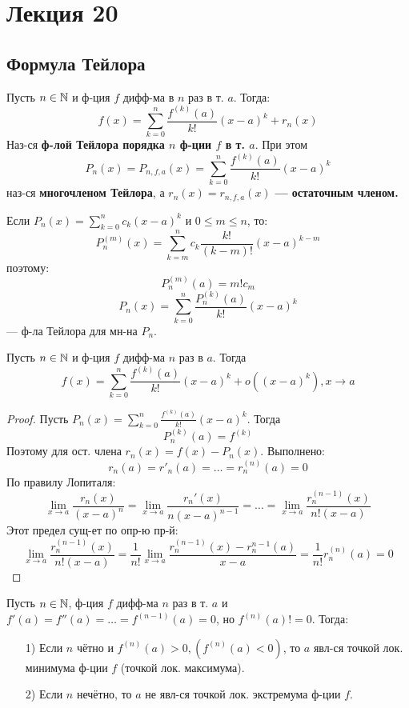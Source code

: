 \section{Лекция 20}
\subsection{Формула Тейлора}
\begin{definition}
Пусть $n \in \mathbb{N}$ и ф-ция $f$ дифф-ма в $n$ раз в т. $a$. Тогда:
\[
f(x) = \sum_{k = 0}^{n} \frac{f^{(k)}(a)}{k!}(x - a)^{k} + r_n(x)
\]
Наз-ся \textbf{ф-лой Тейлора порядка $n$ ф-ции $f$ в т. $a$}. При этом
\[
  P_n(x) = P_{n, f, a}(x) = \sum_{k = 0}^{n} \frac{f^{(k)}(a)}{k!}(x - a)^{k}
\]
наз-ся \textbf{многочленом Тейлора}, а $r_n(x) = r_{n, f, a}(x)$ \textbf{--- остаточным членом.}
\end{definition}
\begin{example}
Если $P_n(x) = \sum_{k = 0}^{n} c_k (x - a)^{k}$ и $0 \leq m \leq n$, то:
\[
P_n^{(m)}(x) = \sum_{k = m}^{n} c_k\frac{k!}{(k - m)!} (x - a)^{k - m}
\]
поэтому:
\[
P_n^{(m)}(a) = m! c_m
\]
\[
P_n(x) = \sum_{k = 0}^{n} \frac{P_n^{(k)}(a)}{k!} (x - a)^{k}
\]
--- ф-ла Тейлора для мн-на $P_n$.
\end{example}
\begin{theorem}
Пусть $n \in \mathbb{N}$ и ф-ция $f$ дифф-ма $n$ раз в $a$. Тогда
\[
  f(x) = \sum_{k = 0}^{n} \frac{f^{(k)}(a)}{k!}(x - a)^{k} + o((x - a)^{k}), x \rightarrow a
\]
\end{theorem}
\begin{proof}
Пусть $P_n(x) = \sum_{k = 0}^{n} \frac{f^{(k)}(a)}{k!}(x - a)^{k}$. Тогда
\[
  P_n^{(k)}(a) = f^{(k)}
\]
Поэтому для ост. члена $r_n(x) = f(x) - P_n(x)$. Выполнено:
\[
r_n(a) = r'_n(a) = \ldots = r_n^{(n)}(a) = 0
\]
По правилу Лопиталя:
\[
\lim_{x\to a} \frac{r_n(x)}{(x - a)^{n}} = \lim_{x\to a} \frac{r_n'(x)}{n(x - a)^{n - 1}} = \ldots = \lim_{x\to a} \frac{r_n^{(n - 1)}(x)}{n!(x - a)}
\]
Этот предел сущ-ет по опр-ю пр-й:
\[
\lim_{x\to a} \frac{r_n^{(n - 1)}(x)}{n!(x - a)} = \frac{1}{n!} \lim_{x\to a} \frac{r_n^{(n - 1)}(x) - r_n^{n - 1}(a)}{x - a} = \frac{1}{n!} r_n^{(n)}(a) = 0
\]
\end{proof}
\begin{consequence}
Пусть $n \in \mathbb{N}$, ф-ция $f$ дифф-ма $n$ раз в т. $a$ и $f'(a) = f''(a) = \ldots = f^{(n -1 )}(a) = 0$, но $f^{(n)}(a) != 0$. Тогда:
\begin{itemize}
  \item [1) ] Если $n$ чётно и $f^{(n)}(a) > 0, (f^{(n)}(a) < 0)$, то $a$ явл-ся точкой лок. минимума ф-ции $f$ (точкой лок. максимума).
  \item [2) ] Если $n$ нечётно, то $a$ не явл-ся точкой лок. экстремума ф-ции $f$.
\end{itemize}
\end{consequence}
